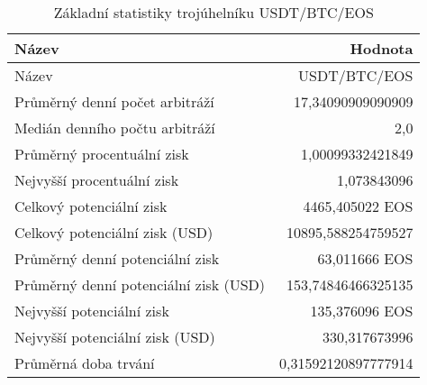 \begin{table}\centering
\caption{Základní statistiky trojúhelníku USDT/BTC/EOS}
\label{USDTBTCEOS_stats}
\begin{tabular}{|| l | r ||}
\hline Název & Hodnota \\ 
\hline\hline Název & USDT/BTC/EOS \\ 
\hline Průměrný denní počet arbitráží & 17,34090909090909 \\ 
\hline Medián denního počtu arbitráží & 2,0 \\ 
\hline Průměrný procentuální zisk & 1,00099332421849 \\ 
\hline Nejvyšší procentuální zisk & 1,073843096 \\ 
\hline Celkový potenciální zisk & 4465,405022 EOS \\ 
\hline Celkový potenciální zisk (USD) & 10895,588254759527 \\ 
\hline Průměrný denní potenciální zisk & 63,011666 EOS \\ 
\hline Průměrný denní potenciální zisk (USD) & 153,74846466325135 \\ 
\hline Nejvyšší potenciální zisk & 135,376096 EOS \\ 
\hline Nejvyšší potenciální zisk (USD) & 330,317673996 \\ 
\hline Průměrná doba trvání & 0,31592120897777914 \\ 
\hline
\end{tabular}
\end{table}
